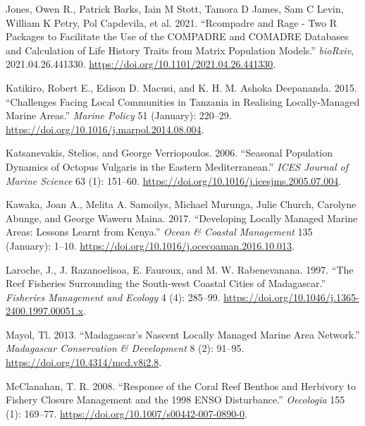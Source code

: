 \documentclass[
]{article}
\newlength{\cslhangindent}
\newlength{\cslentryspacingunit} %
\newenvironment{CSLReferences}[2] %
 {%
  \setlength{\parindent}{0pt}
  \ifodd #1
  \let\oldpar\par
  \def\par{\hangindent=\cslhangindent\oldpar}
  \fi
  \setlength{\parskip}{#2\cslentryspacingunit}
 }%
 {}
\begin{document}
\begin{CSLReferences}{1}{0}
\leavevmode{}%
Jones, Owen R., Patrick Barks, Iain M Stott, Tamora D James, Sam C Levin, William K Petry, Pol Capdevila, et al. 2021. {``Rcompadre and Rage - Two {R} Packages to Facilitate the Use of the {COMPADRE} and {COMADRE} Databases and Calculation of Life History Traits from Matrix Population Models.''} \emph{bioRxiv}, 2021.04.26.441330. \url{https://doi.org/10.1101/2021.04.26.441330}.

\leavevmode{}%
Katikiro, Robert E., Edison D. Macusi, and K. H. M. Ashoka Deepananda. 2015. {``Challenges Facing Local Communities in {Tanzania} in Realising Locally-Managed Marine Areas.''} \emph{Marine Policy} 51 (January): 220--29. \url{https://doi.org/10.1016/j.marpol.2014.08.004}.

\leavevmode{}%
Katsanevakis, Stelios, and George Verriopoulos. 2006. {``Seasonal Population Dynamics of {Octopus} Vulgaris in the Eastern {Mediterranean}.''} \emph{ICES Journal of Marine Science} 63 (1): 151--60. \url{https://doi.org/10.1016/j.icesjms.2005.07.004}.

\leavevmode{}%
Kawaka, Joan A., Melita A. Samoilys, Michael Murunga, Julie Church, Carolyne Abunge, and George Waweru Maina. 2017. {``Developing Locally Managed Marine Areas: {Lessons} Learnt from {Kenya}.''} \emph{Ocean \& Coastal Management} 135 (January): 1--10. \url{https://doi.org/10.1016/j.ocecoaman.2016.10.013}.

\leavevmode{}%
Laroche, J., J. Razanoelisoa, E. Fauroux, and M. W. Rabenevanana. 1997. {``The Reef Fisheries Surrounding the South‐west Coastal Cities of {Madagascar}.''} \emph{Fisheries Management and Ecology} 4 (4): 285--99. \url{https://doi.org/10.1046/j.1365-2400.1997.00051.x}.

\leavevmode{}%
Mayol, Tl. 2013. {``Madagascar's Nascent Locally Managed Marine Area Network.''} \emph{Madagascar Conservation \& Development} 8 (2): 91--95. \url{https://doi.org/10.4314/mcd.v8i2.8}.

\leavevmode{}%
McClanahan, T. R. 2008. {``Response of the Coral Reef Benthos and Herbivory to Fishery Closure Management and the 1998 {ENSO} Disturbance.''} \emph{Oecologia} 155 (1): 169--77. \url{https://doi.org/10.1007/s00442-007-0890-0}.


\end{CSLReferences}
\end{document}
